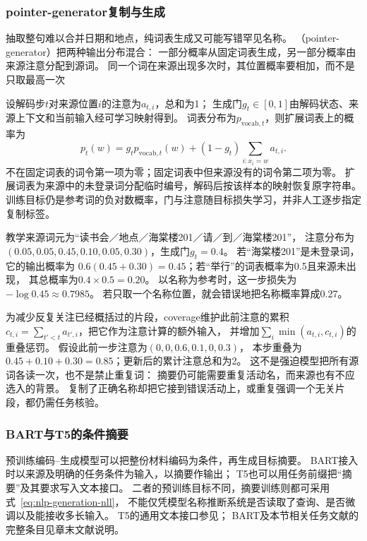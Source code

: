 \subsubsection{pointer-generator复制与生成}
\label{sec:nlp-generation-pointer}

抽取整句难以合并日期和地点，纯词表生成又可能写错罕见名称。
（pointer-generator）把两种输出分布混合：
一部分概率从固定词表生成，另一部分概率由来源注意分配到源词。
同一个词在来源出现多次时，其位置概率要相加，而不是只取最高一次

设解码步$t$对来源位置$i$的注意为$a_{t,i}$，总和为1；
生成门$g_t\in[0,1]$由解码状态、来源上下文和当前输入经可学习映射得到。
词表分布为$p_{\mathrm{vocab},t}$，则扩展词表上的概率为
\begin{equation}
  p_t(w)=g_t p_{\mathrm{vocab},t}(w)
  +(1-g_t)\sum_{i:x_i=w}a_{t,i}.
  \label{eq:nlp-generation-pointer}
\end{equation}
不在固定词表的词令第一项为零；固定词表中但来源没有的词令第二项为零。
扩展词表为来源中的未登录词分配临时编号，解码后按该样本的映射恢复原字符串。
训练目标仍是参考词的负对数概率，门与注意随目标损失学习，并非人工逐步指定复制标签。

教学来源词元为“读书会／地点／海棠楼201／请／到／海棠楼201”，
注意分布为$(0.05,0.05,0.45,0.10,0.05,0.30)$，生成门$g_t=0.4$。
若“海棠楼201”是未登录词，它的输出概率为
$0.6(0.45+0.30)=0.45$；若“举行”的词表概率为0.5且来源未出现，
其总概率为$0.4\times0.5=0.20$。
以名称为参考时，这一步损失为$-\log0.45\approx0.7985$。
若只取一个名称位置，就会错误地把名称概率算成0.27。

为减少反复关注已经概括过的片段，coverage维护此前注意的累积
$c_{t,i}=\sum_{t'<t}a_{t',i}$，把它作为注意计算的额外输入，
并增加$\sum_i\min(a_{t,i},c_{t,i})$的重叠惩罚。
假设此前一步注意为$(0,0,0.6,0.1,0,0.3)$，
本步重叠为$0.45+0.10+0.30=0.85$；更新后的累计注意总和为2。
这不是强迫模型把所有源词各读一次，也不是禁止重复词：
摘要仍可能需要重复活动名，而来源也有不应选入的背景。
复制了正确名称却把它接到错误活动上，或重复强调一个无关片段，都仍需任务核验。

\subsubsection{BART与T5的条件摘要}
\label{sec:nlp-generation-conditional-summary}

预训练编码--生成模型可以把整份材料编码为条件，再生成目标摘要。
BART接入时以来源及明确的任务条件为输入，以摘要作输出；
T5也可以用任务前缀把“摘要”及其要求写入文本接口。
二者的预训练目标不同，摘要训练则都可采用式~\eqref{eq:nlp-generation-nll}，
不能仅凭模型名称推断系统是否读取了查询、是否微调以及能接收多长输入。
T5的通用文本接口参见；
BART及本节相关任务文献的完整条目见章末文献说明。

